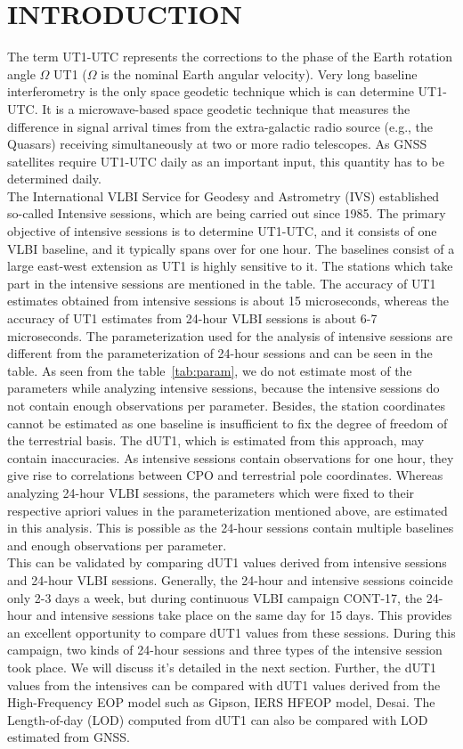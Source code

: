 \documentclass[smallextended]{svjour3}       %
\begin{document}
\section{INTRODUCTION}
\label{intro}
The term UT1-UTC represents the corrections to the phase of the Earth rotation angle $\Omega$ UT1 ($\Omega$ is the nominal Earth angular velocity). Very long baseline interferometry is the only space geodetic technique which is can determine UT1-UTC. It is a microwave-based space geodetic technique that measures the difference in signal arrival times from the extra-galactic radio source (e.g., the Quasars) receiving simultaneously at two or more radio telescopes. As GNSS satellites require UT1-UTC daily as an important input, this quantity has to be determined daily. \\
The International VLBI Service for Geodesy and Astrometry (IVS) established so-called Intensive sessions, which are being carried out since 1985. The primary objective of intensive sessions is to determine UT1-UTC, and it consists of one VLBI baseline, and it typically spans over for one hour. The baselines consist of a large east-west extension as UT1 is highly sensitive to it. The stations which take part in the intensive sessions are mentioned in the table. The accuracy of UT1 estimates obtained from intensive sessions is about 15 microseconds, whereas the accuracy of UT1 estimates from 24-hour VLBI sessions is about 6-7 microseconds. The parameterization used for the analysis of intensive sessions are different from the parameterization of 24-hour sessions and can be seen in the table. As seen from the table~\ref{tab:param}, we do not estimate most of the parameters while analyzing intensive sessions, because the intensive sessions do not contain enough observations per parameter. Besides, the station coordinates cannot be estimated as one baseline is insufficient to fix the degree of freedom of the terrestrial basis. The dUT1, which is estimated from this approach, may contain inaccuracies. As intensive sessions contain observations for one hour, they give rise to correlations between CPO and terrestrial pole coordinates. Whereas analyzing 24-hour VLBI sessions, the parameters which were fixed to their respective apriori values in the parameterization mentioned above, are estimated in this analysis. This is possible as the 24-hour sessions contain multiple baselines and enough observations per parameter. \\
This can be validated by comparing dUT1 values derived from intensive sessions and 24-hour VLBI sessions. Generally, the 24-hour and intensive sessions coincide only 2-3 days a week, but during continuous VLBI campaign CONT-17, the 24-hour and intensive sessions take place on the same day for 15 days. This provides an excellent opportunity to compare dUT1 values from these sessions. During this campaign, two kinds of 24-hour sessions and three types of the intensive session took place. We will discuss it's detailed in the next section. Further, the dUT1 values from the intensives can be compared with dUT1 values derived from the High-Frequency EOP model such as Gipson, IERS HFEOP model, Desai. The Length-of-day (LOD) computed from dUT1 can also be compared with LOD estimated from GNSS. 
\end{document}
